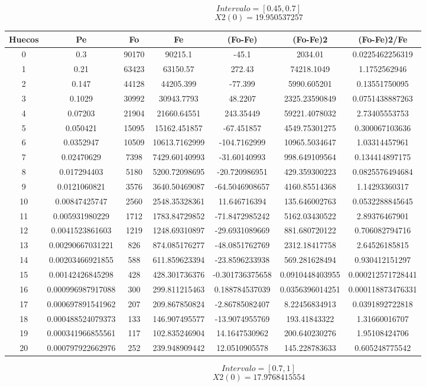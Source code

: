 \documentclass{article}
\begin{document}
$$
Intervalo = [0.45, 0.7]
$$
$$
X2(0) = 19.950537257
$$
\begin{tabular}{|c|c|c|c|c|c|c|}
Huecos&Pe&Fo&Fe&(Fo{-}Fe)&(Fo{-}Fe)2&(Fo{-}Fe)2/Fe\\
\hline
0&0.3&90170&90215.1&{-}45.1&2034.01&0.0225462256319\\
\hline
1&0.21&63423&63150.57&272.43&74218.1049&1.1752562946\\
\hline
2&0.147&44128&44205.399&{-}77.399&5990.605201&0.13551750095\\
\hline
3&0.1029&30992&30943.7793&48.2207&2325.23590849&0.0751438887263\\
\hline
4&0.07203&21904&21660.64551&243.35449&59221.4078032&2.73405553753\\
\hline
5&0.050421&15095&15162.451857&{-}67.451857&4549.75301275&0.300067103636\\
\hline
6&0.0352947&10509&10613.7162999&{-}104.7162999&10965.5034647&1.03314457961\\
\hline
7&0.02470629&7398&7429.60140993&{-}31.60140993&998.649109564&0.134414897175\\
\hline
8&0.017294403&5180&5200.72098695&{-}20.720986951&429.359300223&0.0825576494684\\
\hline
9&0.0121060821&3576&3640.50469087&{-}64.5046908657&4160.85514368&1.14293360317\\
\hline
10&0.00847425747&2560&2548.35328361&11.646716394&135.646002763&0.0532288845645\\
\hline
11&0.005931980229&1712&1783.84729852&{-}71.8472985242&5162.03430522&2.89376467901\\
\hline
12&0.0041523861603&1219&1248.69310897&{-}29.6931089669&881.680720122&0.706082794716\\
\hline
13&0.00290667031221&826&874.085176277&{-}48.0851762769&2312.18417758&2.64526185815\\
\hline
14&0.00203466921855&588&611.859623394&{-}23.8596233938&569.281628494&0.930412151297\\
\hline
15&0.00142426845298&428&428.301736376&{-}0.301736375658&0.0910448403955&0.000212571728441\\
\hline
16&0.000996987917088&300&299.811215463&0.188784537039&0.0356396014251&0.000118873476331\\
\hline
17&0.000697891541962&207&209.867850824&{-}2.86785082407&8.22456834913&0.0391892722818\\
\hline
18&0.000488524079373&133&146.907495577&{-}13.9074955769&193.41843322&1.31660016707\\
\hline
19&0.000341966855561&117&102.835246904&14.1647530962&200.640230276&1.95108424706\\
\hline
20&0.000797922662976&252&239.948909442&12.0510905578&145.228783633&0.605248775542\\
\end{tabular}
$$
Intervalo = [0.7, 1]
$$
$$
X2(0) = 17.9768415554
$$
\end{document}
